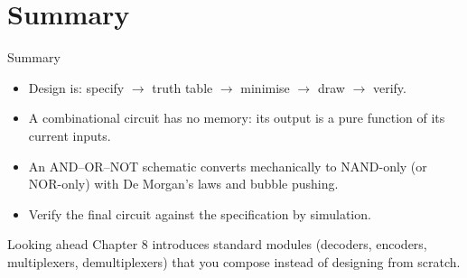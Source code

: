 \documentclass[9pt,aspectratio=169,xcolor=table]{beamer}
\begin{document}
\section{Summary}

\begin{frame}{Summary}
  \begin{itemize}\itemsep3pt\small
    \item Design is: specify $\to$ truth table $\to$ minimise $\to$ draw $\to$ verify.
    \item A combinational circuit has no memory: its output is a pure function of its current inputs.
    \item An AND--OR--NOT schematic converts mechanically to NAND-only (or NOR-only) with De Morgan's laws and bubble pushing.
    \item Verify the final circuit against the specification by simulation.
  \end{itemize}
  \begin{block}{Looking ahead}
    Chapter 8 introduces standard modules (decoders, encoders, multiplexers, demultiplexers) that you compose instead of designing from scratch.
  \end{block}
\end{frame}
\end{document}
